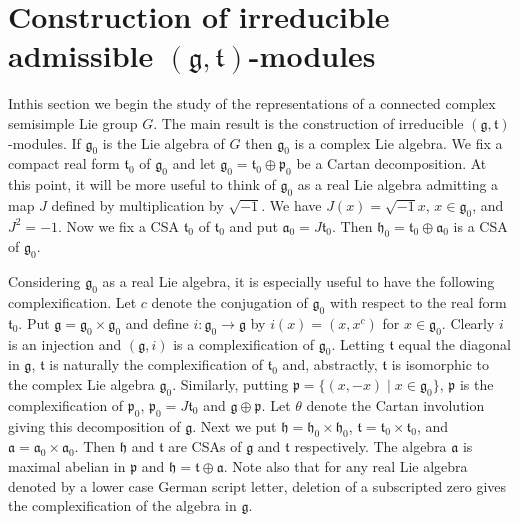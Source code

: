 
\chapter{Construction of irreducible admissible $(\mathfrak{g},
  \mathfrak{t})$-modules}\label{sec6} 

In\pageoriginale this section we begin the study of the
representations of a connected complex semisimple Lie group $G$. The
main result is the construction of irreducible $(\mathfrak{g},
\mathfrak{t})$-modules. If $\mathfrak{g}_0$ is the Lie algebra of $G$
then $\mathfrak{g}_0$ is a complex Lie algebra. We fix a compact real
form $\mathfrak{t}_0$ of $\mathfrak{g}_0$ and let $\mathfrak{g}_0 =
\mathfrak{t}_0 \oplus \mathfrak{p}_0$ be a Cartan decomposition. At
this point, it will be more useful to think of $\mathfrak{g}_0$ as a
real Lie algebra admitting a map $J$ defined by multiplication by
$\sqrt{-1}$. We have $J(x) = \sqrt{-1} x$, $x \in \mathfrak{g}_0$, and
$J^2 = - 1$. Now we fix a CSA $\mathfrak{t}_0$ of $\mathfrak{t}_0$ and
put $\mathfrak{a}_0 = J\mathfrak{t}_0$. Then $\mathfrak{h}_0 =
\mathfrak{t}_0 \oplus \mathfrak{a}_0$ is a CSA of $\mathfrak{g}_0$. 

Considering $\mathfrak{g}_0$ as a real Lie algebra, it is especially
useful to have the following complexification. Let $c$ denote the
conjugation of $\mathfrak{g}_0$ with respect to the real form
$\mathfrak{t}_0$. Put $\mathfrak{g} = \mathfrak{g}_0 \times
\mathfrak{g}_0$ and define $i : \mathfrak{g}_0 \to \mathfrak{g}$ by $i
(x) = (x, x^c)$ for $x \in \mathfrak{g}_0$. Clearly $i$ is an
injection and $(\mathfrak{g}, i)$ is a complexification of
$\mathfrak{g}_0$. Letting $\mathfrak{t}$ equal the diagonal in
$\mathfrak{g}$, $\mathfrak{t}$ is naturally the complexification of
$\mathfrak{t}_0$ and, abstractly, $\mathfrak{t}$ is isomorphic to the
complex Lie algebra $\mathfrak{g}_0$. Similarly, putting $\mathfrak{p}
= \{(x, -x) \mid x \in \mathfrak{g}_0 \}$, $\mathfrak{p}$ is the
complexification of $\mathfrak{p}_0$, $\mathfrak{p}_0 =
J\mathfrak{t}_0$ and $\mathfrak{g} \oplus \mathfrak{p}$. Let $\theta$
denote the Cartan involution giving this decomposition of
$\mathfrak{g}$. Next we put $\mathfrak{h} = \mathfrak{h}_0 \times
\mathfrak{h}_0$, $\mathfrak{t} = \mathfrak{t}_0 \times
\mathfrak{t}_0$, and $\mathfrak{a} = \mathfrak{a}_0 \times
\mathfrak{a}_0$. Then $\mathfrak{h}$ and $\mathfrak{t}$ are CSAs of
$\mathfrak{g}$ and $\mathfrak{t}$ respectively. The algebra
$\mathfrak{a}$ is maximal abelian in $\mathfrak{p}$ and $\mathfrak{h}
= \mathfrak{t} \oplus \mathfrak{a}$. Note also that for any real Lie
algebra denoted by a lower case German script letter, deletion of a
subscripted zero gives the complexification of the algebra in
$\mathfrak{g}$. 

